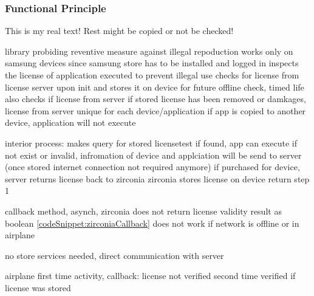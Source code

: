 \subsubsection{Functional Principle} \label{section:license-samsung-functional}
This is my real text! Rest might be copied or not be checked!

%
library probiding reventive measure against illegal repoduction
works only on samsung devices since samsung store has to be installed and logged in
inspects the license of application executed to prevent illegal use
checks for license from license server upon init and stores it on device for future offline check, timed life
also checks if license from server if stored license has been removed or damkages, license from server unique for each device/application
if app is copied to another device, application will not execute

interior process:
makes query for stored licensetest
if found, app can execute
if not exist or invalid, infromation of device and applciation will be send to server (once stored internet connection not required anymore)
if purchased for device, server returns license back to zirconia
zirconia stores license on device
return step 1

callback method, asynch, zirconia does not return license validity result as boolean \ref{codeSnippet:zirconiaCallback}
does not work if network is offline or in airplane

\cite{samsungZirconia}
%



no store services needed, direct communication with server

airplane
first time
activity, callback: license not verified
second time
verified if license was stored
